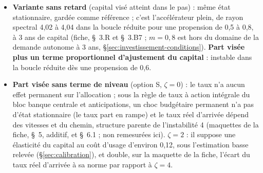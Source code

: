 \documentclass[11pt,a4paper]{article}
\begin{document}
\begin{itemize}
\item \textbf{Variante sans retard} (capital visé atteint dans le pas) : même état stationnaire, gardée comme référence ; c'est l'accélérateur plein, de rayon spectral 4,02 à 4,04 dans la boucle réduite pour une propension de 0,5 à 0,8, à 3 ans de capital (fiche, \S~3.R et \S~3.B7 ; $m = 0{,}8$ est hors du domaine de la demande autonome à 3 ans, \S\ref{sec:investissement-conditions}). \textbf{Part visée plus un terme proportionnel d'ajustement du capital} : instable dans la boucle réduite dès une propension de 0,6.
\item \textbf{Part visée sans terme de niveau} (option S, $\zeta = 0$) : le taux n'a aucun effet permanent sur l'allocation ; sous la règle de taux à action intégrale du bloc banque centrale et anticipations, un choc budgétaire permanent n'a pas d'état stationnaire (le taux part en rampe) et le taux réel d'arrivée dépend des vitesses et du chemin, structure parente de l'instabilité 4 (maquettes de la fiche, \S~5, additif, et \S~6.1 ; non remesurées ici). \textbf{$\zeta = 2$} : il suppose une élasticité du capital au coût d'usage d'environ 0,12, sous l'estimation basse relevée (\S\ref{sec:calibration}), et double, sur la maquette de la fiche, l'écart du taux réel d'arrivée à sa norme par rapport à $\zeta = 4$.

\end{itemize}
\end{document}
